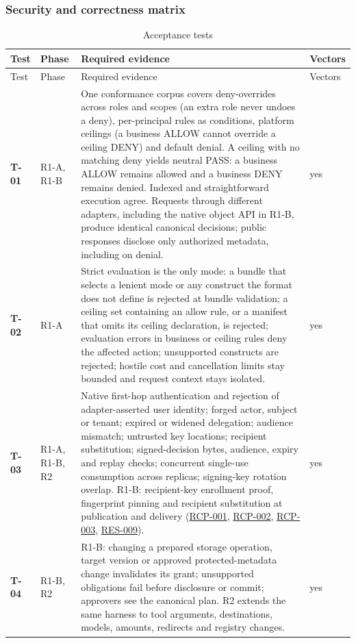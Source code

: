 \documentclass[11pt,a4paper]{article}
\newcommand{\rr}[1]{\hyperlink{req:#1}{#1}}
\newcommand{\testrow}[4]{\hypertarget{test:#1}{\textbf{#1}} & #2 & #3 & #4\\}
\begin{document}
\subsubsection{Security and correctness matrix}\label{sec:testmatrix}
\begin{longtable}{@{}P{0.06\textwidth}P{0.09\textwidth}P{0.68\textwidth}P{0.09\textwidth}@{}}
\caption{Acceptance tests}\label{tab:tests}\\
\toprule Test & Phase & Required evidence & Vectors\\\midrule\endfirsthead
\toprule Test & Phase & Required evidence & Vectors\\\midrule\endhead
\testrow{T-01}{R1-A, R1-B}{One conformance corpus covers deny-overrides across roles and scopes (an extra role never undoes a deny), per-principal rules as conditions, platform ceilings (a business ALLOW cannot override a ceiling DENY) and default denial. A ceiling with no matching deny yields neutral PASS: a business ALLOW remains allowed and a business DENY remains denied. Indexed and straightforward execution agree. Requests through different adapters, including the native object API in R1-B, produce identical canonical decisions; public responses disclose only authorized metadata, including on denial.}{yes}
\testrow{T-02}{R1-A}{Strict evaluation is the only mode: a bundle that selects a lenient mode or any construct the format does not define is rejected at bundle validation; a ceiling set containing an allow rule, or a manifest that omits its ceiling declaration, is rejected; evaluation errors in business or ceiling rules deny the affected action; unsupported constructs are rejected; hostile cost and cancellation limits stay bounded and request context stays isolated.}{yes}
\testrow{T-03}{R1-A, R1-B, R2}{Native first-hop authentication and rejection of adapter-asserted user identity; forged actor, subject or tenant; expired or widened delegation; audience mismatch; untrusted key locations; recipient substitution; signed-decision bytes, audience, expiry and replay checks; concurrent single-use consumption across replicas; signing-key rotation overlap. R1-B: recipient-key enrollment proof, fingerprint pinning and recipient substitution at publication and delivery (\rr{RCP-001}, \rr{RCP-002}, \rr{RCP-003}, \rr{RES-009}).}{yes}
\testrow{T-04}{R1-B, R2}{R1-B: changing a prepared storage operation, target version or approved protected-metadata change invalidates its grant; unsupported obligations fail before disclosure or commit; approvers see the canonical plan. R2 extends the same harness to tool arguments, destinations, models, amounts, redirects and registry changes.}{yes}

\end{longtable}
\end{document}
